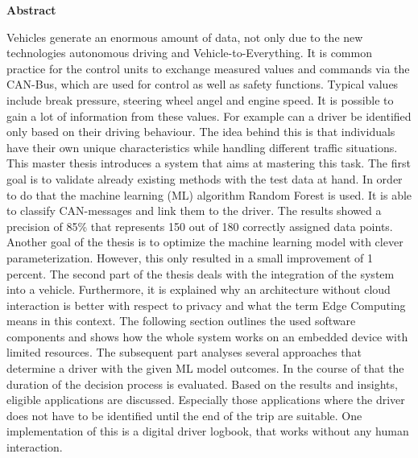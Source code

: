 
\cleardoublepage

{\Large\bfseries Abstract\\}

Vehicles generate an enormous amount of data, not only due to the new technologies autonomous driving and Vehicle-to-Everything. It is common practice for the control units to exchange measured values and commands via the CAN-Bus, which are used for control as well as safety functions. Typical values include break pressure, steering wheel angel and engine speed. It is possible to gain a lot of information from these values. For example can a driver be identified only based on their driving behaviour. The idea behind this is that individuals have their own unique characteristics while handling different traffic situations. This master thesis introduces a system that aims at mastering this task. The first goal is to validate already existing methods with the test data at hand. In order to do that the machine learning (ML) algorithm Random Forest is used. It is able to classify CAN-messages and link them to the driver. The results showed a precision of 85\% that represents 150 out of 180 correctly assigned data points. Another goal of the thesis is to optimize the machine learning model with clever parameterization. However, this only resulted in a small improvement of 1 percent. The second part of the thesis deals with the integration of the system into a vehicle. Furthermore, it is explained why an architecture without cloud interaction is better with respect to privacy and what the term Edge Computing means in this context. The following section outlines the used software components and shows how the whole system works on an embedded device with limited resources. The subsequent part analyses several approaches that determine a driver with the given ML model outcomes. In the course of that the duration of the decision process is evaluated. Based on the results and insights, eligible applications are discussed. Especially those applications where the driver does not have to be identified until the end of the trip are suitable. One implementation of this is a digital driver logbook, that works without any human interaction.